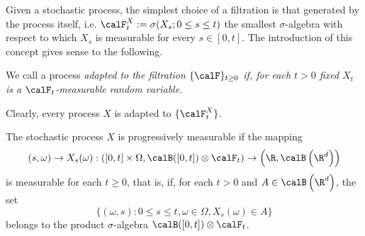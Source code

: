 	Given a stochastic process, the simplest choice of a filtration is that generated
by the process itself, i.e. 
$
	\calF^{X}_t:=\sigma(X_s; 0\leq s\leq t)
$
the smallest $\sigma$-algebra with respect to which $X_s$ is measurable for every $s\in[0, t]$.
The introduction of this concept gives sense to the following.
\begin{definition}
		We call a process \it{adapted} to the filtration $\{\calF\}_{t\geq 0}$  if, for each $t>0$ fixed $X_t$  is a
	$\calF_t$-measurable random variable.
\end{definition}
Clearly, every process $X$ is adapted to $\{ \calF_t^{X}\}$.
\begin{definition}
	The stochastic process $X$ is progressively measurable if the mapping
	$$
		(s,\omega)\to X_s(\omega):
		\left(
			[0,t] \times \Omega,
			\calB([0,t]) \otimes \calF_t
		\right) \to 
		\left(
			\R, \calB\left(\R^d\right)
		\right)
	$$
	is measurable for each $t\geq 0$, that is, if, for each $t>0$ and $A\in \calB\left(\R^d\right)$, 
	the set 
	$$
		\{
			(\omega, s) : 0 \leq s \leq t, \omega \in \Omega, X_s(\omega) \in A
		\}
	$$
	belongs to the product $\sigma$-algebra
	$
		\calB([0,t]) \otimes \calF_t
	$.
\end{definition}
%